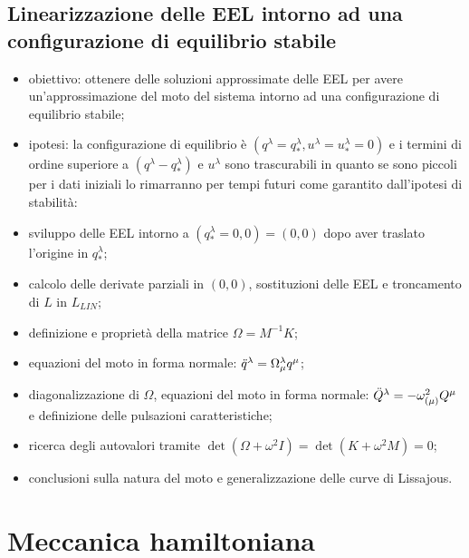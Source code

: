 \documentclass{article}
\theoremstyle{remark}
\begin{document}
\subsection{Linearizzazione delle EEL intorno ad una configurazione di equilibrio stabile}
\begin{itemize}
    \item obiettivo: ottenere delle soluzioni approssimate delle EEL per avere un'approssimazione del moto del sistema intorno ad una configurazione di equilibrio stabile;
    \item ipotesi: la configurazione di equilibrio è $(q^\lambda=q^\lambda_*,u^\lambda=u^\lambda_*=0)$ e i termini di ordine superiore a $(q^\lambda-q^\lambda_*)$ e $u^\lambda$ sono trascurabili in quanto se sono piccoli per i dati iniziali lo rimarranno per tempi futuri come garantito dall'ipotesi di stabilità:
    \item sviluppo delle EEL intorno a $(q^\lambda_*=0,0)=(0,0)$ dopo aver traslato l'origine in $q^\lambda_*$;
    \item calcolo delle derivate parziali in $(0,0)$, sostituzioni delle EEL e troncamento di $L$ in $L_{LIN}$;
    \item definizione e proprietà della matrice $\Omega=M^{-1}K$;
    \item equazioni del moto in forma normale: $\Ddot{q}^\lambda=\Omega^\lambda_\mu q^\mu$;
    \item diagonalizzazione di $\Omega$, equazioni del moto in forma normale: $\Ddot{Q}^\lambda=-\omega^2_{(\mu)} Q^\mu$ e definizione delle pulsazioni caratteristiche;
    \item ricerca degli autovalori tramite $\det(\Omega+\omega^2I)=\det(K+\omega^2M)=0$;
    \item conclusioni sulla natura del moto e generalizzazione delle curve di Lissajous.
\end{itemize}

\section{Meccanica hamiltoniana}
\end{document}
